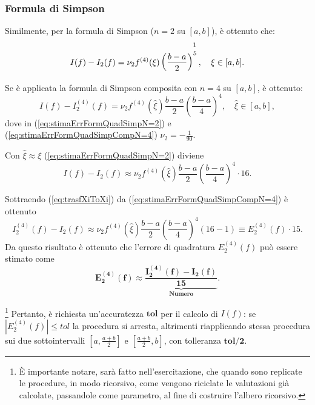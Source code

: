 \subsubsection{Formula di Simpson}
Similmente, per la formula di Simpson ($n=2$ su $[a,b]$), è ottenuto che:
\begin{equation}\label{eq:stimaErrFormQuadSimpN=2}
    I(f)-I_2(f)=\nu_2 f^{(4)}(\xi)\left(\frac{b-a}{2}\right)^{\overset{\footnotemark}{5}},\quad \xi\in[a,b].
\end{equation}

Se è applicata la formula di Simpson composita con $n=4$ su $[a,b]$, è ottenuto:
\begin{equation}\label{eq:stimaErrFormQuadSimpCompN=4}
    I(f)-I_2^{(4)}(f)=\nu_2 f^{(4)}(\widehat\xi)\frac{b-a}{2}\left(\frac{b-a}{4}\right)^4,\quad \widehat\xi\in[a,b],
\end{equation}
dove in (\ref{eq:stimaErrFormQuadSimpN=2}) e (\ref{eq:stimaErrFormQuadSimpCompN=4}) $\nu_2=-\frac{1}{90}$.

Con $\widehat\xi\approx\xi$ (\ref{eq:stimaErrFormQuadSimpN=2}) diviene
\begin{equation}\label{eq:trasfXiToXi}
    I(f)-I_2(f)\approx\nu_2 f^{(4)}(\widehat\xi)\frac{b-a}{2}\left(\frac{b-a}{4}\right)^4\cdot 16.
\end{equation}

Sottraendo (\ref{eq:trasfXiToXi}) da (\ref{eq:stimaErrFormQuadSimpCompN=4}) è ottenuto
\begin{equation*}
    I_2^{(4)}(f)-I_2(f)\approx\nu_2 f^{(4)}(\widehat\xi)\frac{b-a}{2}\left(\frac{b-a}{4}\right)^4(16-1)\equiv E_2^{(4)}(f)\cdot 15.
\end{equation*}
Da questo risultato è ottenuto che l'errore di quadratura $E_2^{(4)}(f)$ può essere stimato come
\begin{equation}
    \boldsymbol{E_2^{(4)}(f)\approx\underbrace{\frac{I_2^{(4)}(f)-I_2(f)}{15}}_{\text{Numero}}}.
\end{equation}

\footnote{È importante notare, sarà fatto nell'esercitazione, che quando sono replicate le procedure, in modo ricorsivo, come vengono riciclate le valutazioni già calcolate, passandole come parametro, al fine di costruire l'albero ricorsivo.}
Pertanto, è richiesta un'accuratezza $\boldsymbol{tol}$ per il calcolo di $I(f)$: se $\left|E_2^{(4)}(f)\right|\leq tol$ la procedura si arresta, altrimenti riapplicando stessa procedura sui due sottointervalli $\left[a,\frac{a+b}{2}\right]$ e $\left[\frac{a+b}{2},b\right]$, con tolleranza $\boldsymbol{tol/2}$.

